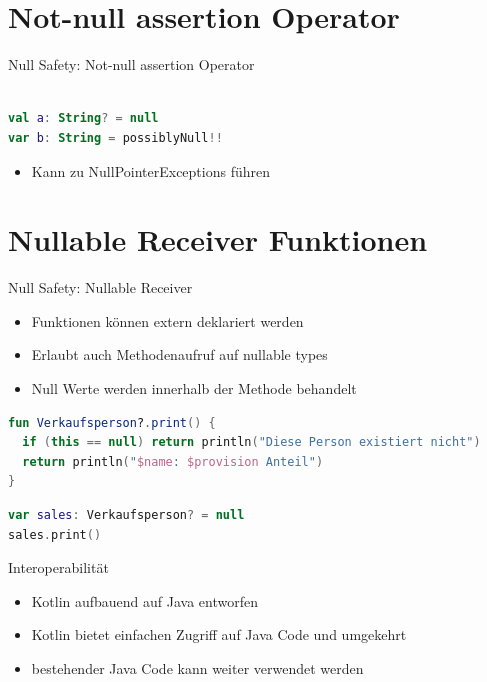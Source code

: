 \documentclass{beamer}
\begin{document}
\section{Not-null assertion Operator}

\begin{frame}[fragile]{Null Safety: Not-null assertion Operator}

  \begin{lstlisting}[language=Kotlin]

val a: String? = null
var b: String = possiblyNull!!
  \end{lstlisting}
  \pause
  \begin{itemize}[<+->]
    \item Kann zu NullPointerExceptions führen
  \end{itemize}
\end{frame}

\section{Nullable Receiver Funktionen}

\begin{frame}[fragile]{Null Safety: Nullable Receiver}
  \begin{itemize}[<+->]
    \item Funktionen können extern deklariert werden
    \item Erlaubt auch Methodenaufruf auf nullable types
    \item Null Werte werden innerhalb der Methode behandelt
  \end{itemize}
  \pause \vspace{1cm}
  \begin{lstlisting}[language=Kotlin]
fun Verkaufsperson?.print() {
  if (this == null) return println("Diese Person existiert nicht")
  return println("$name: $provision Anteil")
}
  \end{lstlisting}
  \pause
  \begin{lstlisting}[language=Kotlin]
var sales: Verkaufsperson? = null
sales.print()
  \end{lstlisting}
\end{frame}

\begin{frame}[fragile]{Interoperabilität}
  \begin{itemize}[<+->]
    \item Kotlin aufbauend auf Java entworfen
    \item Kotlin bietet einfachen Zugriff auf Java Code und umgekehrt
    \item bestehender Java Code kann weiter verwendet werden
  \end{itemize}
\end{frame}
\end{document}
